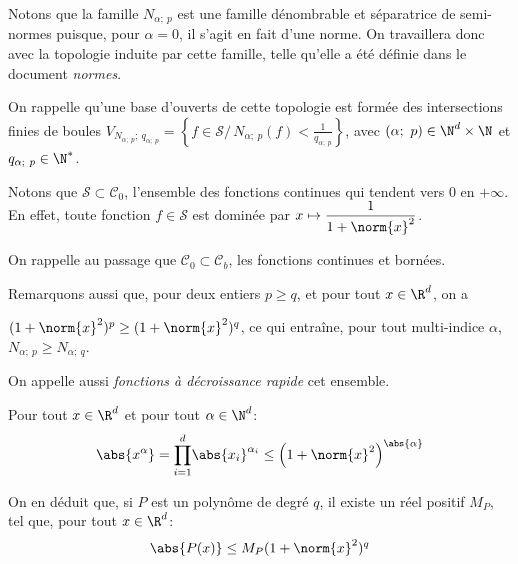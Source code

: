 Notons que la famille $N_{\alpha;~p}$ est une famille dénombrable et séparatrice de semi-normes puisque, pour $\alpha = 0$, il s'agit en fait d'une norme. On travaillera donc avec la topologie induite par cette famille, telle qu'elle a été définie dans le document \emph{normes}. 


\begin{cerveau}
On rappelle qu'une base d'ouverts de cette topologie est formée des intersections finies de boules $V_{N_{\alpha;~p};~q_{\alpha;~p}} = \left \{f \in \mathcal{S}/ \, N_{\alpha;~p}(f) < \frac{1}{q_{\alpha;~p}} \right \}$, avec $(\alpha;~p) \in \N^d \times \N$ et  $q_{\alpha;~p} \in \N^*$.
\end{cerveau}


\begin{listremarques}
\item
Notons que $\mathcal{S} \subset \mathcal{C}_0$, l'ensemble des fonctions continues qui tendent vers $0$ en $+\infty$. En effet, toute fonction $f \in \mathcal{S}$ est dominée par $x \mapsto \dfrac{1}{1+\norm{x}^2}$. 

\medskip
On rappelle au passage que $\mathcal{C}_0 \subset \mathcal{C}_b$, les fonctions continues et bornées.

\item
Remarquons aussi que, pour deux entiers $p \geq q$, et pour tout $x \in \R^d$, on a 

$(1+\norm{x}^2)^p \geq (1+\norm{x}^2)^q$, ce qui entraîne, pour tout multi-indice $\alpha$, $N_{\alpha;~p} \geq N_{\alpha;~q}$.

\item
On appelle aussi \emph{fonctions à décroissance rapide} cet ensemble.
\end{listremarques}

\begin{lem}
Pour tout $x \in \R^d$ et pour tout $\alpha \in \N^d$:
\[
\abs{x^\alpha} = \displaystyle{\prod_{i=1}^d} \abs{x_i}^{\alpha_i} \leq \left (1+\norm{x}^2\right )^{\abs{\alpha}}
\]

\medskip
On en déduit que, si $P$ est un polynôme de degré $q$, il existe un réel positif $M_P$, tel que, pour tout $x \in \R^d$:
\[
\abs{P(x)} \leq M_P (1+\norm{x}^2)^{q}
\]
\end{lem}


